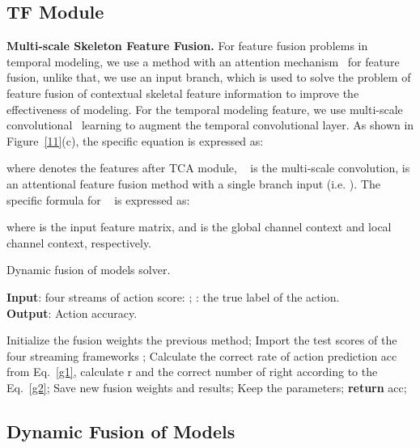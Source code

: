 \documentclass[letterpaper]{article} \usepackage[submission]{aaai23}  \usepackage{times}  \usepackage{helvet}  \usepackage{courier}  \usepackage[hyphens]{url}  \usepackage{graphicx} \urlstyle{rm} \def\UrlFont{\rm}  \usepackage{natbib}  \usepackage{caption} \frenchspacing  \setlength{\pdfpagewidth}{8.5in} \setlength{\pdfpageheight}{11in} \usepackage{algorithm}
\begin{document}
\subsection{TF Module}
\label{sec:C}
\noindent
{\bf Multi-scale Skeleton Feature Fusion.} For feature fusion problems in temporal modeling, we use a method with an attention mechanism~\cite{2020Attentional} for feature fusion, unlike that, we use an input branch, which is used to solve the problem of feature fusion of contextual skeletal feature information to improve the effectiveness of modeling. For the temporal modeling feature, we use multi-scale convolutional~\cite{2021Channel} learning to augment the temporal convolutional layer. As shown in Figure~\ref{11}(c), the specific equation is expressed as:



where  denotes the features after TCA module, ~\cite{2021Channel} is the multi-scale convolution,  is an attentional feature fusion method with a single branch input (i.e. ). The specific formula for ~\cite{2020Attentional} is expressed as:



where  is the input feature matrix,  and  is the global channel context and local channel context, respectively.




\begin{algorithm}[tb]
\caption{Dynamic fusion of models solver.}
\label{tab:al}
\textbf{Input}: four streams of action score: ; : the true label of the action.\\
\textbf{Output}: Action accuracy.
\begin{algorithmic}[1] \STATE Initialize the fusion weights  the previous method;
\STATE Import the test scores of the four streaming frameworks ;
\WHILE{bacd and  (0,1]}
\STATE Calculate the correct rate of action prediction acc from Eq.~\ref{g1}, calculate r and the correct number of right according to the Eq.~\ref{g2};
\STATE Save new fusion weights and results;
\ELSE
\STATE Keep the parameters;
\ENDIF
\ENDWHILE
\STATE \textbf{return} acc;
\end{algorithmic}
\end{algorithm}









\subsection{Dynamic Fusion of Models}
\label{sec:E}
\end{document}
